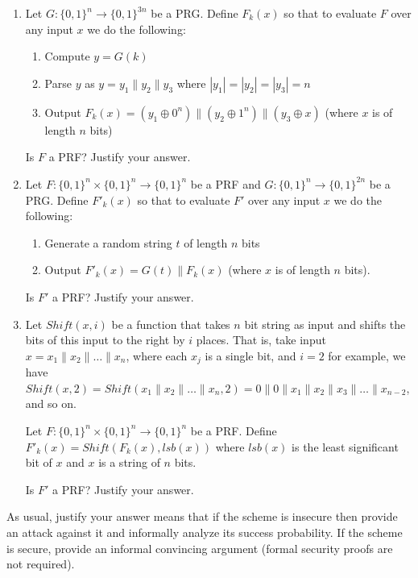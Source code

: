 \documentclass[12pt]{article}
\newcommand{\zo}{\{0,1\}}
\newcommand*\concat{\mathbin{\|}}
\newcommand\xor{\oplus}
\begin{document}
\newpage
{}
\begin{enumerate}
    \item Let $G: \zo^{n} \rightarrow \zo^{3n}$ be a PRG. Define $F_k(x)$ so that to evaluate $F$ over any input $x$ we do the following: 
    \begin{enumerate}
        \item Compute $y = G(k)$ 
        \item Parse $y$ as $y = y_1 \concat y_2 \concat y_3$ where $|y_1| = |y_2| = |y_3| = n$
        \item Output $F_k(x) = (y_1 \xor 0^n) \concat (y_2 \xor 1^n) \concat (y_3 \xor x)$ (where $x$ is of length $n$ bits)
    \end{enumerate}
    Is $F$ a PRF? Justify your answer.
    
    \item Let $F: \zo^n \times \zo^{n} \rightarrow \zo^{n}$ be a PRF and $G: \zo^{n} \rightarrow \zo^{2n}$ be a PRG.
    Define $F'_k(x)$ so that to evaluate $F'$ over any input $x$ we do the following:
    \begin{enumerate}
        \item Generate a random string $t$ of length $n$ bits
        \item Output $F'_k(x)= G(t) \concat F_k(x)$ (where $x$ is of length $n$ bits). 
    \end{enumerate}
    Is $F'$ a PRF? Justify your answer.
    
    \item Let $Shift(x,i)$ be a function that takes $n$ bit string as input and shifts the bits of this input to the right by $i$ places. That is, take input $x = x_1 \concat x_2 \concat \dots \concat x_n$, where each $x_j$ is a single bit, and $i = 2$ for example, we have $Shift(x, 2) = Shift(x_1 \concat x_2 \concat \dots \concat x_n, 2) = 0 \concat 0 \concat x_1 \concat x_2 \concat x_3 \concat \dots \concat x_{n-2}$, and so on. 
    
    Let $F: \zo^n \times \zo^{n} \rightarrow \zo^{n}$ be a PRF. Define $F'_k(x) = Shift(F_k(x), lsb(x))$ where $lsb(x)$ is the least significant bit of $x$ and $x$ is a string of $n$ bits.
    
    Is $F'$ a PRF? Justify your answer.

\end{enumerate}


 As usual, justify your answer means that if the scheme is insecure then provide an attack against it and informally analyze its success probability. If the scheme is secure, provide an informal convincing argument (formal security proofs are not required).\newline
\end{document}
